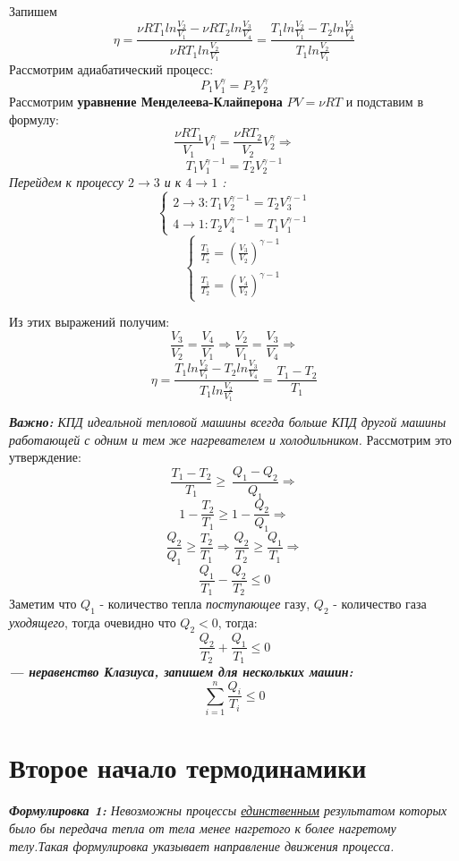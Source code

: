 Запишем
\[ \eta  = \frac{\nu RT_1 ln{\frac{V_2}{V_1}} - \nu RT_2 ln{\frac{V_3}{V_4}}}{\nu RT_1 ln{\frac{V_2}{V_1}}} =  \frac{T_1ln{\frac{V_2}{V_1}} - T_2ln{\frac{V_3}{V_4}}}{T_1ln{\frac{V_2}{V_1}}}\]
Рассмотрим адиабатический процесс:
\[ P_1V_1^{\gamma} = P_2V_2^{\gamma}\]
Рассмотрим \textbf{уравнение Менделеева-Клайперона }$ PV = \nu RT$ и подставим в формулу:
\[ \frac{\nu RT_1}{V_1}V_1^{\gamma} = \frac{\nu RT_2}{V_2}V_2^{\gamma} \Rightarrow \]
\[ T_1V_1^{\gamma - 1} = T_2V_2^{\gamma - 1}\]
\textit{Перейдем к процессу $2 \to 3$  и к $ 4 \to 1$ :}
\begin{equation*}
    \begin{cases}
        2 \to 3: T_1V_2^{\gamma - 1} = T_2V_3^{\gamma - 1}
        \\
        4 \to 1: T_2V_4^{\gamma - 1} = T_1V_1^{\gamma - 1}
    \end{cases}
\end{equation*}
\begin{equation*}
    \begin{cases}
        \frac{T_1}{T_2} = (\frac{V_3}{V_2}) ^ {\gamma - 1}
        \\
        \frac{T_1}{T_2} = (\frac{V_4}{V_2}) ^ {\gamma - 1}
    \end{cases}
\end{equation*}

Из этих выражений получим:
\[ \frac{V_3}{V_2} = \frac{V_4}{V_1} \Rightarrow \frac{V_2}{V_1} = \frac{V_3}{V_4} \Rightarrow\]
\[ \eta = \frac{T_1ln{\frac{V_2}{V_1}} - T_2ln{\frac{V_3}{V_4}}}{T_1ln{\frac{V_2}{V_1}}} = \frac{T_1 - T_2}{T_1}\]

\textit{\textbf{Важно: }КПД идеальной тепловой машины всегда больше КПД другой машины работающей с одним и тем же нагревателем и холодильником.} Рассмотрим это утверждение:
\[ \frac{T_1 - T_2}{T_1} \geq\ \frac{Q_1 - Q_2}{Q_1} \Rightarrow \]
\[1 - \frac{T_2}{T_1} \geq 1 - \frac{Q_2}{Q_1} \Rightarrow \]
\[ \frac{Q_2}{Q_1} \geq \frac{T_2}{T_1} \Rightarrow \frac{Q_2}{T_2} \geq \frac{Q_1}{T_1} \Rightarrow \]
\[\frac{Q_1}{T_1} - \frac{Q_2}{T_2}  \leq 0\]
Заметим что $Q_1$ - количество тепла \textit{поступающее} газу, $Q_2$ - количество газа \textit{уходящего}, тогда очевидно что $Q_2 < 0$, тогда:
\[\frac{Q_2}{T_2} + \frac{Q_1}{T_1} \leq 0\]
\textbf{\textit{ --- неравенство Клазиуса, запишем для нескольких машин:}}
\[ \sum_{i = 1}^{n} \frac{Q_i}{T_i} \leq 0\]

\section{Второе начало термодинамики}
\textit{\textbf{Формулировка 1:} Невозможны процессы \underline{единственным} результатом которых было бы передача тепла от тела менее нагретого к более нагретому телу.Такая формулировка указывает направление движения процесса.}

